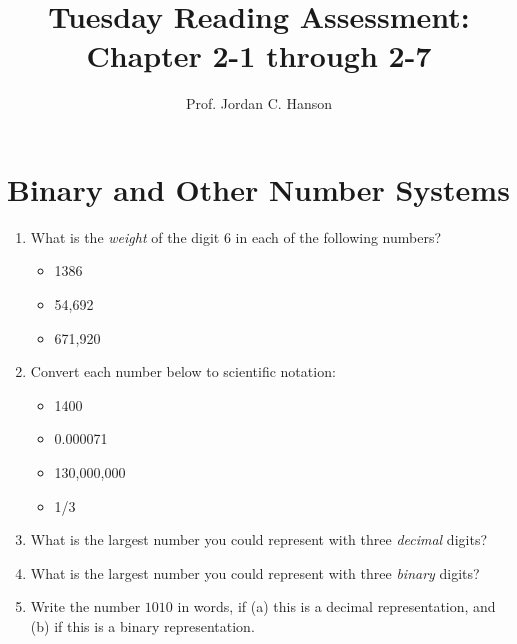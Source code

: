 \documentclass{article}
\begin{document}
\title{Tuesday Reading Assessment: Chapter 2-1 through 2-7}
\author{Prof. Jordan C. Hanson}

\maketitle

\section{Binary and Other Number Systems}

\begin{enumerate}
\item What is the \textit{weight} of the digit 6 in each of the following numbers?
\begin{itemize}
\item 1386
\item 54,692
\item 671,920
\end{itemize}
\item Convert each number below to scientific notation:
\begin{itemize}
\item 1400
\item 0.000071
\item 130,000,000
\item 1/3
\end{itemize}
\item What is the largest number you could represent with three \textit{decimal} digits? \\ \vspace{2cm}
\item What is the largest number you could represent with three \textit{binary} digits? \\ \vspace{2cm}
\item Write the number $1010$ in words, if (a) this is a decimal representation, and (b) if this is a binary representation. \\ \vspace{2cm}
\end{enumerate}
\end{document}
